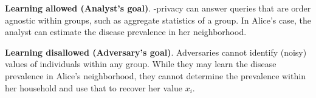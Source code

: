 \vspace{-0.3cm}
\squishlistfour
    \item \textbf{Learning allowed (Analyst's goal)}. 
  \name-privacy can answer queries that are order agnostic within groups, such as aggregate statistics of a group. In Alice's case, the analyst can estimate the disease prevalence in her neighborhood. 
    \item  \textbf{Learning disallowed (Adversary's goal)}. 
    Adversaries cannot identify (noisy) values of individuals  within any group. While they may learn the disease prevalence in Alice's neighborhood, they cannot determine the prevalence within her household and use that to recover her value $x_i$.
\squishendfour  
\vspace{-0.2cm}


